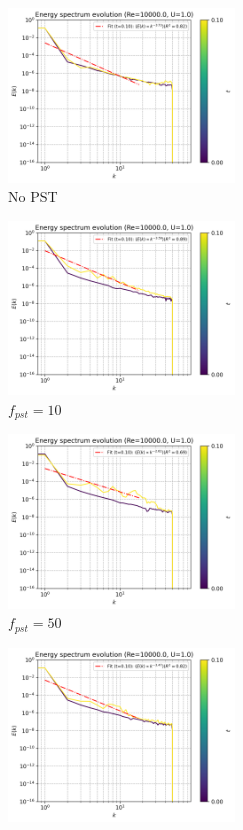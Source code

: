 \begin{figure}[htbp!]
  \begin{subfigure}{7cm}
  \centering\includegraphics[width=6cm]{Code-Figures/mon2017/pst/c0_20_tait_pec_dtmul_1_nx_100_pst_-1_re_10000_mon2017/energy_spectrum_evolution.png}
  \caption{No PST}
  \end{subfigure}
  \begin{subfigure}{7cm}
  \centering\includegraphics[width=6cm]{Code-Figures/mon2017/pst/c0_20_tait_pec_dtmul_1_nx_100_pst_10_re_10000_mon2017/energy_spectrum_evolution.png}
  \caption{$f_{pst} = 10$}
  \end{subfigure}
  \begin{subfigure}{7cm}
  \centering\includegraphics[width=6cm]{Code-Figures/mon2017/pst/c0_20_tait_pec_dtmul_1_nx_100_pst_50_re_10000_mon2017/energy_spectrum_evolution.png}
  \caption{$f_{pst} = 50$}
  \end{subfigure}
  \begin{subfigure}{7cm}
  \centering\includegraphics[width=6cm]{Code-Figures/mon2017/pst/c0_20_tait_pec_dtmul_1_nx_100_pst_100_re_10000_mon2017/energy_spectrum_evolution.png}

\end{subfigure}
\end{figure}
